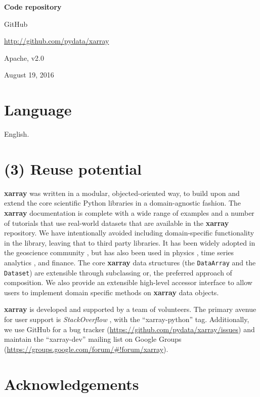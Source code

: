 \documentclass{jors}
\begin{document}
{\bf Code repository}

\begin{description}[noitemsep,topsep=0pt]
	\item[Name:] GitHub
	\item[Identifier:] \url{http://github.com/pydata/xarray}
	\item[Licence:] Apache, v2.0
	\item[Date published:] August 19, 2016
\end{description}

\section*{Language}

English.

\section*{(3) Reuse potential}

\textbf{xarray} was written in a modular, objected-oriented way, to build upon and extend the core scientific Python libraries in a domain-agnostic fashion.
The \textbf{xarray} documentation is complete with a wide range of examples and a number of tutorials that use real-world datasets that are available in the \textbf{xarray} repository.
We have intentionally avoided including domain-specific functionality in the library, leaving that to third party libraries.
It has been widely adopted in the geoscience community \citep[e.g.][]{xgcm,Dawson_2016a,Dawson_2016b}, but has also been used in physics \citep[e.g.][]{pycalphad}, time series analytics \citep{cesium}, and finance.
The core \textbf{xarray} data structures (the \verb|DataArray| and the \verb|Dataset|) are extensible through subclassing or, the preferred approach of composition.
We also provide an extensible high-level accessor interface to allow users to implement domain specific methods on \textbf{xarray} data objects.

\textbf{xarray} is developed and supported by a team of volunteers.
The primary avenue for user support is \textit{StackOverflow} \citep{stackoverflow}, with the ``xarray-python'' tag.
Additionally, we use GitHub for a bug tracker (\url{https://github.com/pydata/xarray/issues}) and maintain the ``xarray-dev'' mailing list on Google Groups (\url{https://groups.google.com/forum/#!forum/xarray}).

\section*{Acknowledgements}
\end{document}
